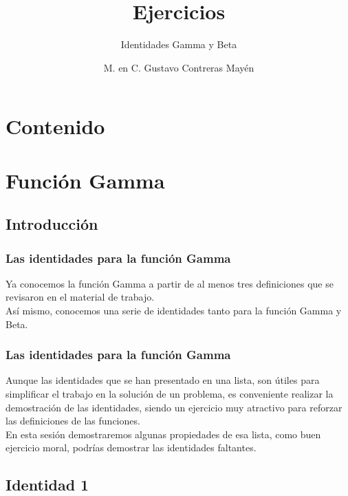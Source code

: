 \documentclass[12pt]{beamer}
\title{\large{Ejercicios}}
\subtitle{Identidades Gamma y Beta}
\author{M. en C. Gustavo Contreras Mayén}
\date{}
\institute{Facultad de Ciencias - UNAM}
\begin{document}
\maketitle
\fontsize{14}{14}\selectfont
{}
\section*{Contenido}

\section{Función Gamma}

\subsection{Introducción}
\begin{frame}
\frametitle{Las identidades para la función Gamma}
Ya conocemos la función Gamma a partir de al menos tres definiciones que se revisaron en el material de trabajo.
\\
\bigskip
\pause
Así mismo, conocemos una serie de identidades tanto para la función Gamma y Beta.
\end{frame}
\begin{frame}
\frametitle{Las identidades para la función Gamma}
Aunque las identidades que se han presentado en una lista, son útiles para simplificar el trabajo en la solución de un problema, es conveniente realizar la demostración de las identidades, siendo un ejercicio muy atractivo para reforzar las definiciones de las funciones.
\\
\bigskip
\pause
En esta sesión demostraremos algunas propiedades de esa lista, como buen ejercicio moral, podrías demostrar las identidades faltantes.
\end{frame}

\subsection{Identidad 1}
\end{document}
